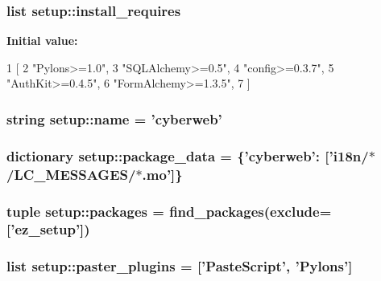 \hypertarget{namespacesetup_a85dad60316171523a8538c5f6dd764c3}{
\subsubsection[{install\-\_\-requires}]{\setlength{\rightskip}{0pt plus 5cm}list {\bf setup\-::install\-\_\-requires}}}\label{namespacesetup_a85dad60316171523a8538c5f6dd764c3}
{\bfseries \-Initial value\-:}
\begin{DoxyCode}
1 [
2         "Pylons>=1.0",
3         "SQLAlchemy>=0.5",
4         "config>=0.3.7",
5         "AuthKit>=0.4.5",
6         "FormAlchemy>=1.3.5",
7     ]
\end{DoxyCode}
\hypertarget{namespacesetup_a4b28e5b21e957c451ff3aa28f58c6383}{
\subsubsection[{name}]{\setlength{\rightskip}{0pt plus 5cm}string {\bf setup\-::name} = 'cyberweb'}}\label{namespacesetup_a4b28e5b21e957c451ff3aa28f58c6383}
\hypertarget{namespacesetup_a9564b88d698a28beb160196680de9e7d}{
\subsubsection[{package\-\_\-data}]{\setlength{\rightskip}{0pt plus 5cm}dictionary {\bf setup\-::package\-\_\-data} = \{'cyberweb'\-: \mbox{[}'i18n/$\ast$/\-L\-C\-\_\-\-M\-E\-S\-S\-A\-G\-E\-S/$\ast$.mo'\mbox{]}\}}}\label{namespacesetup_a9564b88d698a28beb160196680de9e7d}
\hypertarget{namespacesetup_a61c4df0a151113447498726d453324de}{
\subsubsection[{packages}]{\setlength{\rightskip}{0pt plus 5cm}tuple {\bf setup\-::packages} = find\-\_\-packages(exclude=\mbox{[}'ez\-\_\-setup'\mbox{]})}}\label{namespacesetup_a61c4df0a151113447498726d453324de}
\hypertarget{namespacesetup_ac19e4f19d366d12c2c857064aeafa0e7}{
\subsubsection[{paster\-\_\-plugins}]{\setlength{\rightskip}{0pt plus 5cm}list {\bf setup\-::paster\-\_\-plugins} = \mbox{[}'\-Paste\-Script', '\-Pylons'\mbox{]}}}\label{namespacesetup_ac19e4f19d366d12c2c857064aeafa0e7}
